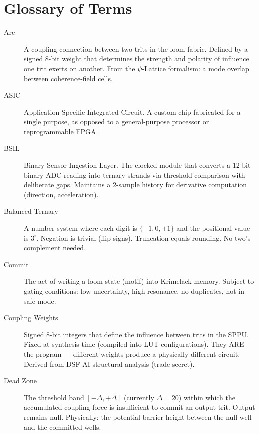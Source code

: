 \documentclass[11pt,a4paper]{article}
\begin{document}
\section{Glossary of Terms}

\begin{description}

\item[Arc] A coupling connection between two trits in the loom fabric. Defined by a signed 8-bit weight that determines the strength and polarity of influence one trit exerts on another. From the $\psi$-Lattice formalism: a mode overlap between coherence-field cells.

\item[ASIC] Application-Specific Integrated Circuit. A custom chip fabricated for a single purpose, as opposed to a general-purpose processor or reprogrammable FPGA.

\item[BSIL] Binary Sensor Ingestion Layer. The clocked module that converts a 12-bit binary ADC reading into ternary strands via threshold comparison with deliberate gaps. Maintains a 2-sample history for derivative computation (direction, acceleration).

\item[Balanced Ternary] A number system where each digit is $\{-1, 0, +1\}$ and the positional value is $3^i$. Negation is trivial (flip signs). Truncation equals rounding. No two's complement needed.

\item[Commit] The act of writing a loom state (motif) into Krimelack memory. Subject to gating conditions: low uncertainty, high resonance, no duplicates, not in safe mode.

\item[Coupling Weights] Signed 8-bit integers that define the influence between trits in the SPPU. Fixed at synthesis time (compiled into LUT configurations). They ARE the program --- different weights produce a physically different circuit. Derived from DSF-AI structural analysis (trade secret).

\item[Dead Zone] The threshold band $[-\Delta, +\Delta]$ (currently $\Delta = 20$) within which the accumulated coupling force is insufficient to commit an output trit. Output remains null. Physically: the potential barrier height between the null well and the committed wells.


\end{description}
\end{document}
